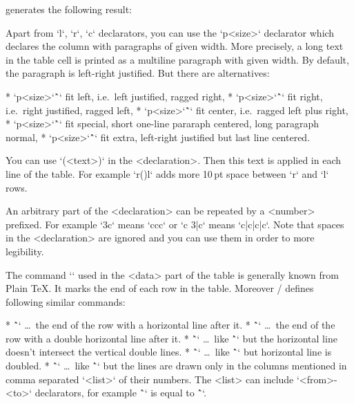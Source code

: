 \begtt
{}
\endtt
%
generates the following result:

\medskip
\noindent\hfil{}
\medskip

Apart from `l`, `r`, `c` declarators, you can use the `p{<size>}` declarator
which declares the column with paragraphs of given width. More precisely, 
a long text in the table cell is printed as a multiline paragraph with given width.
By default, the paragraph is left-right justified. But there are
alternatives:

\begitems
* `p{<size>`\^`\fL}` fit left, i.e.\ left justified, ragged right,
* `p{<size>`\^`\fR}` fit right, i.e.\ right justified, ragged left,
* `p{<size>`\^`\fC}` fit center, i.e.\ ragged left plus right,
* `p{<size>`\^`\fS}` fit special, short one-line pararaph centered, 
                long paragraph normal,
* `p{<size>`\^`\fX}` fit extra, left-right justified but last line centered. 
\enditems 

You can use `(<text>)` in the <declaration>. Then this text is applied in
each line of the table. For example `r(\kern10pt)l` adds more 10\,pt space
between `r` and `l` rows. 

An arbitrary part of the <declaration> can be repeated by a <number>
prefixed. For example `3c` means `ccc` or `c 3{|c}` means
`c|c|c|c`. Note that spaces in the <declaration> are ignored and you 
can use them in order to more legibility.
 
The command `\cr` used in the <data> part of the table 
is generally known from Plain \TeX. It marks the end of each row in the table.
Moreover \OpTeX/ defines following similar commands:

\begitems
* \^`\crl` \dots\ the end of the row with a horizontal line after it.
* \^`\crll` \dots\ the end of the row with a double horizontal line after it.
* \^`\crli` \dots\ like \^`\crl` but the horizontal line doesn't intersect the
      vertical double lines.
* \^`\crlli` \dots\ like \^`\crli` but horizontal line is doubled.
* \^`` \dots\ like \^`\crli` but the lines are drawn only in the
  columns mentioned in comma separated `<list>` of their numbers.
  The <list> can include `<from>-<to>` declarators, for example
  \^`` is equal to \^``. 
\enditems

